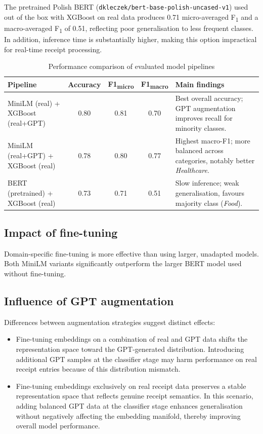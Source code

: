 \documentclass{SGGW-thesis-EN}
\begin{document}
The pretrained Polish BERT (\texttt{dkleczek/bert-base-polish-uncased-v1}) used out of the box with XGBoost on real
data produces 0.71 micro-averaged F\textsubscript{1} and a macro-averaged F\textsubscript{1} of 0.51, reflecting poor
generalisation to less frequent classes. In addition, inference time is substantially higher, making this option
impractical for real-time receipt processing.

\begin{table}[h]
  \centering
  \caption{Performance comparison of evaluated model pipelines}
  \label{tab:results_comparison}
  \begin{tabularx}{\textwidth}{lcccX}
    \toprule
    \textbf{Pipeline} & \textbf{Accuracy} & \textbf{F1\textsubscript{micro}} & \textbf{F1\textsubscript{macro}} & \textbf{Main findings} \\
    \midrule
    MiniLM (real) + XGBoost (real+GPT) & 0.80 & 0.81 & 0.70 &
      Best overall accuracy; GPT augmentation improves recall for minority classes. \\
    MiniLM (real+GPT) + XGBoost (real) & 0.78 & 0.80 & 0.77 &
      Highest macro-F1; more balanced across categories, notably better \emph{Healthcare}. \\
    BERT (pretrained) + XGBoost (real) & 0.73 & 0.71 & 0.51 &
      Slow inference; weak generalisation, favours majority class (\emph{Food}). \\
    \bottomrule
  \end{tabularx}
\end{table}


\subsection{Impact of fine-tuning}
Domain-specific fine-tuning is more effective than using larger, unadapted models. Both MiniLM variants
significantly outperform the larger BERT model used without fine-tuning.

\subsection{Influence of GPT augmentation}
Differences between augmentation strategies suggest distinct effects:
\begin{itemize}
  \item Fine-tuning embeddings on a combination of real and GPT data shifts the representation space toward
        the GPT-generated distribution. Introducing additional GPT samples at the classifier stage may harm
        performance on real receipt entries because of this distribution mismatch.
  \item Fine-tuning embeddings exclusively on real receipt data preserves a stable representation space that
        reflects genuine receipt semantics. In this scenario, adding balanced GPT data at the classifier stage
        enhances generalisation without negatively affecting the embedding manifold, thereby improving overall
        model performance.
\end{itemize}
\end{document}
